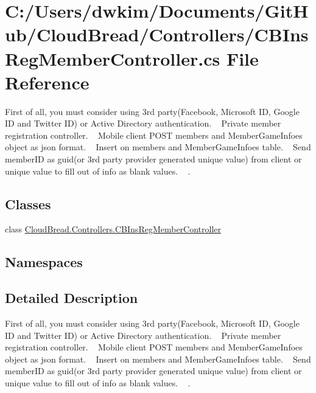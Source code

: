 \hypertarget{a00140}{}\section{C\+:/\+Users/dwkim/\+Documents/\+Git\+Hub/\+Cloud\+Bread/\+Controllers/\+C\+B\+Ins\+Reg\+Member\+Controller.cs File Reference}
\label{a00140}


First of all, you must consider using 3rd party(\+Facebook, Microsoft I\+D, Google I\+D and Twitter I\+D) or Active Directory authentication. ~\newline
Private member registration controller. ~\newline
Mobile client P\+O\+ST members and Member\+Game\+Infoes object as json format. ~\newline
Insert on members and Member\+Game\+Infoes table. ~\newline
Send member\+ID as guid(or 3rd party provider generated unique value) from client or unique value to fill out of info as blank values. ~\newline
.  


\subsection*{Classes}
\begin{DoxyCompactItemize}
\item 
class \hyperlink{a00027}{Cloud\+Bread.\+Controllers.\+C\+B\+Ins\+Reg\+Member\+Controller}
\end{DoxyCompactItemize}
\subsection*{Namespaces}
\begin{DoxyCompactItemize}
\end{DoxyCompactItemize}


\subsection{Detailed Description}
First of all, you must consider using 3rd party(\+Facebook, Microsoft I\+D, Google I\+D and Twitter I\+D) or Active Directory authentication. ~\newline
Private member registration controller. ~\newline
Mobile client P\+O\+ST members and Member\+Game\+Infoes object as json format. ~\newline
Insert on members and Member\+Game\+Infoes table. ~\newline
Send member\+ID as guid(or 3rd party provider generated unique value) from client or unique value to fill out of info as blank values. ~\newline
. 

